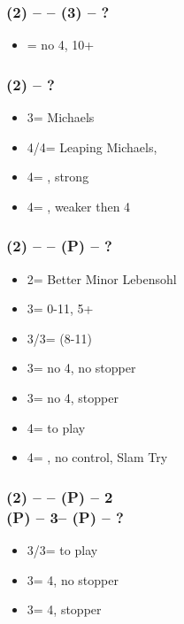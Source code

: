 \subsubsection*{(2\hearts) -- \dbl -- (3\hearts) -- ?}
\begin{itemize}
    \item \dbl = no 4\spades, 10+
\end{itemize}

\subsubsection*{(2\spades) -- ?}
\begin{itemize}
    \item 3\spades = Michaels
    \item 4\clubs/4\diams = Leaping Michaels, \gf
    \item 4\spades = \minor, strong
    \item 4\nt = \minor, weaker then 4\hearts
\end{itemize}

\subsubsection*{(2\spades) -- \dbl -- (P) -- ?}
\begin{itemize}
    \item 2\nt = Better Minor Lebensohl
    \item 3\clubs = 0-11, 5+\clubs
    \item 3\diams/3\hearts = \inv (8-11)
    \item 3\spades = no 4\hearts, no \spades stopper
    \item 3\nt = no 4\hearts, \spades stopper
    \item 4\hearts = to play
    \item 4\hearts = \minor, no \spades control, Slam Try \vimp
\end{itemize}

\subsubsection*{(2\spades) -- \dbl -- (P) -- 2\nt \\
                (P) -- 3\minor -- (P) -- ?}
\begin{itemize}
    \item 3\hearts/3\diams = to play
    \item 3\spades = 4\hearts, no \spades stopper
    \item 3\nt = 4\hearts, \spades stopper
\end{itemize}

